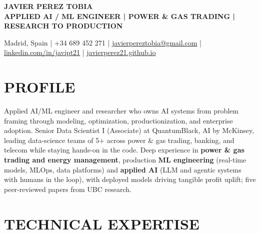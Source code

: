 \documentclass[10pt,a4paper]{article}
\begin{document}

\begin{center}

  {\LARGE\bfseries\color{accent}
  JAVIER PEREZ TOBIA}\\[0.20em]

  {\normalsize\bfseries
  APPLIED AI / ML ENGINEER
  \;|\;
  POWER \& GAS TRADING
  \;|\;
  RESEARCH TO PRODUCTION}\\[0.30em]

  \small

  Madrid, Spain
  \;|\;
  +34 689 452 271
  \;|\;
  \href{mailto:javierpereztobia@gmail.com}
  {javierpereztobia@gmail.com}
  \;|\;
  \href{https://www.linkedin.com/in/javipt21}
  {linkedin.com/in/javipt21}
  \;|\;
  \href{https://javierperez21.github.io}
  {javierperez21.github.io}

\end{center}

\vspace{-0.25em}


\section{PROFILE}

\small

Applied AI/ML engineer and researcher who owns AI systems from problem
framing through modeling, optimization, productionization, and enterprise
adoption. Senior Data Scientist I (Associate) at QuantumBlack, AI by McKinsey,
leading data-science teams of 5+ across power \& gas trading, banking, and
telecom while staying hands-on in the code. Deep experience in
\textbf{power \& gas trading and energy management}, production
\textbf{ML engineering} (real-time models, MLOps, data platforms) and
\textbf{applied AI} (LLM and agentic systems with humans in the loop), with
deployed models driving tangible profit uplift; five peer-reviewed papers from UBC research.


\section{TECHNICAL EXPERTISE}
\end{document}
